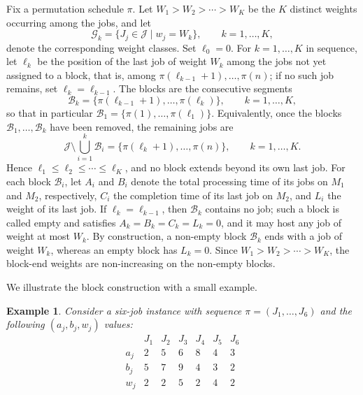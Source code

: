 \documentclass[12pt]{article}
\newtheorem{exam}{Example}[section]
\begin{document}
\begin{sloppypar}
        Fix a permutation schedule $\pi$. Let $W_1 > W_2 > \cdots > W_K$ be the $K$ distinct weights
        occurring among the jobs, and let
        \[
        \mathcal{G}_k = \{J_j \in \mathcal{J} \mid w_j = W_k\}, \qquad k = 1,\dots,K,
        \]
        denote the corresponding weight classes. Set $\ell_0 = 0$. For $k = 1,\dots,K$ in sequence, let
        $\ell_k$ be the position of the last job of weight $W_k$ among the jobs not yet assigned to a block,
        that is, among $\pi(\ell_{k-1}+1),\dots,\pi(n)$; if no such job remains, set $\ell_k = \ell_{k-1}$.
        The blocks are the consecutive segments
        \[
        \mathcal{B}_k = \{\pi(\ell_{k-1}+1), \dots, \pi(\ell_k)\}, \qquad k = 1,\dots,K,
        \]
        so that in particular $\mathcal{B}_1 = \{\pi(1),\dots,\pi(\ell_1)\}$. Equivalently, once the blocks
        $\mathcal{B}_1,\dots,\mathcal{B}_k$ have been removed, the remaining jobs are
        \[
        \mathcal{J}\setminus\bigcup_{i=1}^{k}\mathcal{B}_i = \{\pi(\ell_k+1),\dots,\pi(n)\}, \qquad k=1,\dots,K .
        \]
        Hence $\ell_1\le\ell_2\le\cdots\le\ell_K$, and no block extends beyond its own last job.
        For each block $\mathcal{B}_i$, let $A_i$ and $B_i$ denote the total processing time of its jobs on
        $M_1$ and $M_2$, respectively, $C_i$ the completion time of its last job on $M_2$, and $L_i$ the
        weight of its last job. If $\ell_k = \ell_{k-1}$, then $\mathcal{B}_k$ contains no job; such a block
        is called empty and satisfies $A_k = B_k = C_k = L_k = 0$, and it may host any job of weight at most
        $W_k$. By construction, a non-empty block $\mathcal{B}_k$ ends with a job of weight $W_k$, whereas an
        empty block has $L_k = 0$. Since $W_1 > W_2 > \cdots > W_K$, the block-end weights are non-increasing
        on the non-empty blocks.
        
        We illustrate the block construction with a small example.
        \begin{exam}\label{ex:blocking}
            Consider a six-job instance with sequence $\pi = (J_1, \dots, J_6)$ and the following $(a_j,b_j,w_j)$ values:
            \[
            \begin{array}{c|cccccc}
                & J_1 & J_2 & J_3 & J_4 & J_5 & J_6 \\
                \hline
                a_j &  2  &  5  &  6  &  8  &  4  &  3  \\
                b_j &  5  &  7  &  9  &  4  &  3  &  2  \\
                w_j &  2  &  2  &  5  &  2  &  4  &  2
            \end{array}
            \]
            

\end{exam}
\end{sloppypar}
\end{document}
